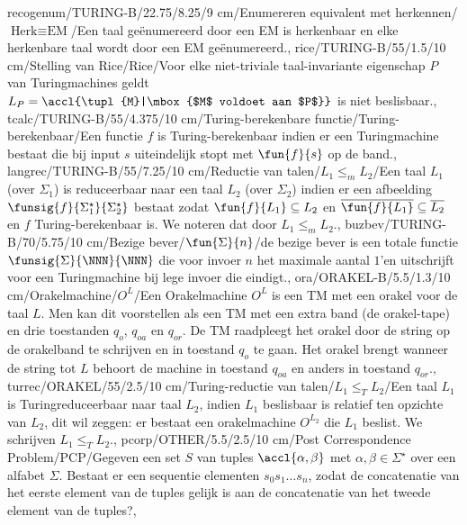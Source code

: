 recogenum/TURING-B/22.75/8.25/9 cm/Enumereren equivalent met herkennen/$\mbox{Herk}\equiv\mbox{EM}$/{Een taal ge\"enumereerd door een EM is herkenbaar en elke herkenbare taal wordt door een EM ge\"enumereerd.},
rice/TURING-B/55/1.5/10 cm/Stelling van Rice/Rice/{Voor elke niet-triviale taal-invariante eigenschap $P$ van Turingmachines geldt $L_{P}=\accl{\tupl{M}|\mbox{$M$ voldoet aan $P$}}$ is niet beslisbaar.},
tcalc/TURING-B/55/4.375/10 cm/Turing-berekenbare functie/Turing-berekenbaar/{Een functie $f$ is Turing-berekenbaar indien er een Turingmachine bestaat die bij input $s$ uiteindelijk stopt met $\fun{f}{s}$ op de band.},
langrec/TURING-B/55/7.25/10 cm/Reductie van talen/$L_1\leq_mL_2$/{Een taal $L_1$ (over $\Sigma_1$) is reduceerbaar naar een taal $L_2$ (over $\Sigma_2$) indien er een afbeelding $\funsig{f}{\Sigma_1^{\star}}{\Sigma_2^{\star}}$ bestaat zodat $\fun{f}{L_1}\subseteq L_2$ en $\overline{\fun{f}{L_1}}\subseteq\overline{L_2}$ en $f$ Turing-berekenbaar is. We noteren dat door $L_1\leq_mL_2$.},
buzbev/TURING-B/70/5.75/10 cm/Bezige bever/$\fun{\Sigma}{n}$/{de bezige bever is een totale functie $\funsig{\Sigma}{\NNN}{\NNN}$ die voor invoer $n$ het maximale aantal $1$'en uitschrijft voor een Turingmachine bij lege invoer die eindigt.},
ora/ORAKEL-B/5.5/1.3/10 cm/Orakelmachine/$O^L$/{Een Orakelmachine $O^L$ is een TM met een orakel voor de taal $L$. Men kan dit voorstellen als een TM met een extra band (de orakel-tape) en drie toestanden $q_o$, $q_{oa}$ en $q_{or}$. De TM raadpleegt het orakel door de string op de orakelband te schrijven en in toestand $q_o$ te gaan. Het orakel brengt wanneer de string tot $L$ behoort de machine in toestand $q_{oa}$ en anders in toestand $q_{or}$.},
turrec/ORAKEL/55/2.5/10 cm/Turing-reductie van talen/$L_1\leq_TL_2$/{Een taal $L_1$ is Turingreduceerbaar naar taal $L_2$, indien $L_1$ beslisbaar is relatief ten opzichte van $L_2$, dit wil zeggen: er bestaat een orakelmachine $O^{L_2}$ die $L_1$ beslist. We schrijven $L_1\leq_TL_2$.},
pcorp/OTHER/5.5/2.5/10 cm/Post Correspondence Problem/PCP/{Gegeven een set $S$ van tuples $\accl{\alpha,\beta}$ met $\alpha,\beta\in\Sigma^{\star}$ over een alfabet $\Sigma$. Bestaat er een sequentie elementen $s_0s_1\ldots s_n$, zodat de concatenatie van het eerste element van de tuples gelijk is aan de concatenatie van het tweede element van de tuples?},
